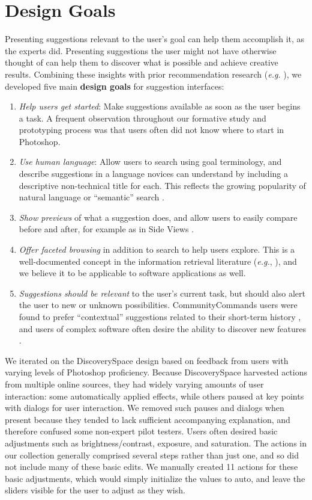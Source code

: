 \section{Design Goals}
Presenting suggestions relevant to the user's goal can help them accomplish it, as the experts did. Presenting suggestions the user might not have otherwise thought of can help them to discover what is possible and achieve creative results. Combining these insights with prior recommendation research (\textit{e.g.} \cite{Hearst2006, Hearst2009Book, Koren2008, Li2011}), we developed five main \textbf{design goals} for suggestion interfaces:
\begin{enumerate}
    \item \textit{Help users get started}: Make suggestions available as soon as the user begins a task. A frequent observation throughout our formative study and prototyping process was that users often did not know where to start in Photoshop.
    \item \textit{Use human language}: Allow users to search using goal terminology, and describe suggestions in a language novices can understand by including a descriptive non-technical title for each. This reflects the growing popularity of natural language or ``semantic'' search \cite{Hearst2009Book}.
    \item \textit{Show previews} of what a suggestion does, and allow users to easily compare before and after, for example as in Side Views \cite{Terry2002}.
    \item \textit{Offer faceted browsing} in addition to search to help users explore. This is a well-documented concept in the information retrieval literature (\textit{e.g.}, \cite{Hearst2006, Koren2008, Yee2003}), and we believe it to be applicable to software applications as well.
    \item \textit{Suggestions should be relevant} to the user's current task, but should also alert the user to new or unknown possibilities. CommunityCommands users were found to prefer ``contextual'' suggestions related to their short-term history \cite{Li2011}, and users of complex software often desire the ability to discover new features \cite{MM-gi2000}.
\end{enumerate}

We iterated on the Discovery\-Space design based on feedback from users with varying levels of Photoshop proficiency. Because Discovery\-Space harvested actions from multiple online sources, they had widely varying amounts of user interaction: some automatically applied effects, while others paused at key points with dialogs for user interaction. We removed such pauses and dialogs when present because they tended to lack sufficient accompanying explanation, and therefore confused some non-expert pilot testers. Users often desired basic adjustments such as brightness/contrast, exposure, and saturation. The actions in our collection generally comprised several steps rather than just one, and so did not include many of these basic edits. We manually created 11 actions for these basic adjustments, which would simply initialize the values to auto, and leave the sliders visible for the user to adjust as they wish.